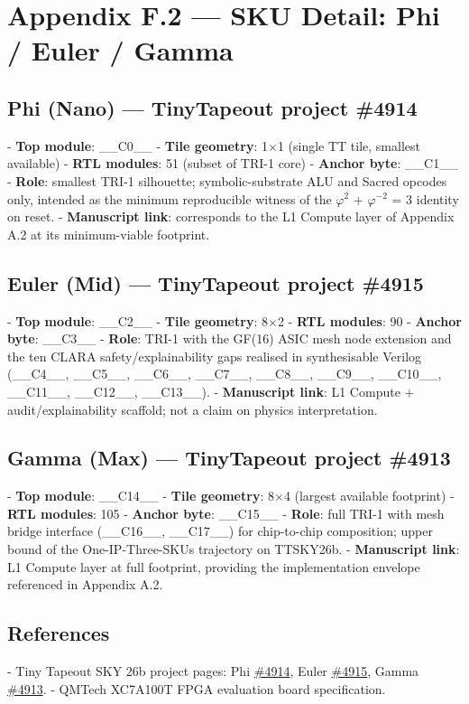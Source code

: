 
\section{Appendix F.2 --- SKU Detail: Phi / Euler / Gamma}

\subsection{Phi (Nano) --- TinyTapeout project \#4914}

- \textbf{Top module}: \_\_C0\_\_
- \textbf{Tile geometry}: 1$\times$1 (single TT tile, smallest available)
- \textbf{RTL modules}: 51 (subset of TRI-1 core)
- \textbf{Anchor byte}: \_\_C1\_\_
- \textbf{Role}: smallest TRI-1 silhouette; symbolic-substrate ALU and Sacred opcodes only, intended as the minimum reproducible witness of the $\varphi^{2}$ + $\varphi^{-2}$ = 3 identity on reset.
- \textbf{Manuscript link}: corresponds to the L1 Compute layer of Appendix A.2 at its minimum-viable footprint.

\subsection{Euler (Mid) --- TinyTapeout project \#4915}

- \textbf{Top module}: \_\_C2\_\_
- \textbf{Tile geometry}: 8$\times$2
- \textbf{RTL modules}: 90
- \textbf{Anchor byte}: \_\_C3\_\_
- \textbf{Role}: TRI-1 with the GF(16) ASIC mesh node extension and the ten CLARA safety/explainability gaps realised in synthesisable Verilog (\_\_C4\_\_, \_\_C5\_\_, \_\_C6\_\_, \_\_C7\_\_, \_\_C8\_\_, \_\_C9\_\_, \_\_C10\_\_, \_\_C11\_\_, \_\_C12\_\_, \_\_C13\_\_).
- \textbf{Manuscript link}: L1 Compute + audit/explainability scaffold; not a claim on physics interpretation.

\subsection{Gamma (Max) --- TinyTapeout project \#4913}

- \textbf{Top module}: \_\_C14\_\_
- \textbf{Tile geometry}: 8$\times$4 (largest available footprint)
- \textbf{RTL modules}: 105
- \textbf{Anchor byte}: \_\_C15\_\_
- \textbf{Role}: full TRI-1 with mesh bridge interface (\_\_C16\_\_, \_\_C17\_\_) for chip-to-chip composition; upper bound of the One-IP-Three-SKUs trajectory on TTSKY26b.
- \textbf{Manuscript link}: L1 Compute layer at full footprint, providing the implementation envelope referenced in Appendix A.2.

\subsection{References}

- Tiny Tapeout SKY 26b project pages: Phi \href{https://app.tinytapeout.com/projects/4914}{\#4914}, Euler \href{https://app.tinytapeout.com/projects/4915}{\#4915}, Gamma \href{https://app.tinytapeout.com/projects/4913}{\#4913}.
- QMTech XC7A100T FPGA evaluation board specification.
